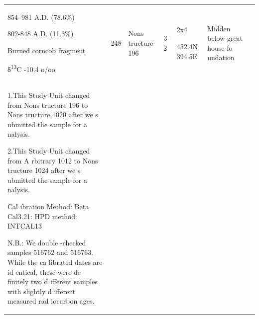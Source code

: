 \documentclass[
  12pt,
]{krantz}
\begin{document}
\begin{longtable}[]{@{}lllllll@{}}
\begin{minipage}[t]{0.12\columnwidth}
854--981
A.D.
(78.6\%)

802-848
A.D.
(11.3\%)

Burned
corncob
fragment

δ\textsuperscript{13}C
-10.4
o/oo\strut
\end{minipage} & \begin{minipage}[t]{0.07\columnwidth}\raggedright
248\strut
\end{minipage} & \begin{minipage}[t]{0.12\columnwidth}\raggedright
Nons
tructure
196\strut
\end{minipage} & \begin{minipage}[t]{0.08\columnwidth}\raggedright
3-2\strut
\end{minipage} & \begin{minipage}[t]{0.12\columnwidth}\raggedright
2x4

452.4N
394.5E\strut
\end{minipage} & \begin{minipage}[t]{0.12\columnwidth}\raggedright
Midden
below
great
house
fo
undation\strut
\end{minipage}\tabularnewline
\begin{minipage}[t]{0.12\columnwidth}\raggedright
1.This
Study
Unit
changed
from
Nons
tructure
196 to
Nons
tructure
1020
after we
s
ubmitted
the
sample
for
a
nalysis.

2.This
Study
Unit
changed
from
A
rbitrary
1012 to
Nons
tructure
1024
after we
s
ubmitted
the
sample
for
a
nalysis.

Cal
ibration
Method:
Beta
Cal3.21:
HPD
method:
INTCAL13

N.B.: We
double
-checked
samples
516762
and
516763.
While
the
ca
librated
dates
are
id
entical,
these
were
de
finitely
two
d
ifferent
samples
with
slightly
d
ifferent
measured
rad
iocarbon
ages.\strut
\end{minipage} & \begin{minipage}[t]{0.12\columnwidth}\raggedright
\strut
\end{minipage} & \begin{minipage}[t]{0.07\columnwidth}\raggedright
\strut
\end{minipage} & \begin{minipage}[t]{0.12\columnwidth}\raggedright
\strut
\end{minipage} & \begin{minipage}[t]{0.08\columnwidth}\raggedright
\strut
\end{minipage} & \begin{minipage}[t]{0.12\columnwidth}\raggedright
\strut
\end{minipage} & \begin{minipage}[t]{0.12\columnwidth}\raggedright
\strut
\end{minipage}\tabularnewline
\bottomrule
\end{longtable}
\end{document}
